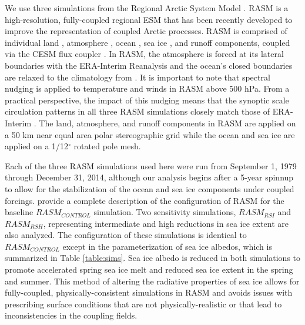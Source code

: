 We use three simulations from the Regional Arctic System Model \citep[RASM; ][]{Hamman_2016a,Roberts_2015a}.
RASM is a high-resolution, fully-coupled regional ESM that has been recently developed to improve the representation of coupled Arctic processes.
RASM is comprised of individual land \citep[see ][]{Hamman_2016a}, atmosphere \citep[see ][]{Cassano_2016}, ocean \citep[see ][]{Roberts_2015a}, sea ice \citep[see ][]{Roberts_2015a}, and runoff \citep[see ][]{Hamman_2016b} components, coupled via the CESM flux coupler \citep{Craig_2012}.
In RASM, the atmosphere is forced at its lateral boundaries with the ERA-Interim Reanalysis \citep{Dee_2011} and the ocean's closed boundaries are relaxed to the climatology from \citet{Steele_2001}.
It is important to note that spectral nudging is applied to temperature and winds in RASM above 500 hPa.
From a practical perspective, the impact of this nudging means that the synoptic scale circulation patterns in all three RASM simulations closely match those of ERA-Interim \citep{Glisan_2013}.
The land, atmosphere, and runoff components in RASM are applied on a 50 km near equal area polar stereographic grid while the ocean and sea ice are applied on a 1/12$^{\circ}$ rotated pole mesh.

Each of the three RASM simulations used here were run from September 1, 1979 through December 31, 2014, although our analysis begins after a 5-year spinnup to allow for the stabilization of the ocean and sea ice components under coupled forcings.
\citet{Hamman_2016b} provide a complete description of the configuration of RASM for the baseline $RASM_{CONTROL}$ simulation.
Two sensitivity simulations, $RASM_{RSI}$ and $RASM_{RSH}$, representing intermediate and high reductions in sea ice extent are also analyzed.
The configuration of these simulations is identical to $RASM_{CONTROL}$ except in the parameterization of sea ice albedos, which is summarized in Table \ref{table:sims}.
Sea ice albedo is reduced in both simulations to promote accelerated spring sea ice melt and reduced sea ice extent in the spring and summer.
This method of altering the radiative properties of sea ice allows for fully-coupled, physically-consistent simulations in RASM and avoids issues with prescribing surface conditions that are not physically-realistic or that lead to inconsistencies in the coupling fields.

